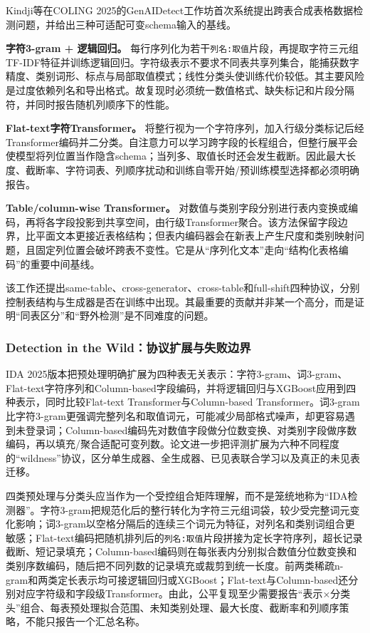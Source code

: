 \documentclass[
  chinese,
  12pt,
  a4paper,
  chinese,
  UTF8]{ctexart}
\begin{document}
Kindji等在COLING
2025的GenAIDetect工作坊首次系统提出跨表合成表格数据检测问题，并给出三种可适配可变schema输入的基线\autocite{kindji2025cross}。

\textbf{字符3-gram + 逻辑回归。}
每行序列化为若干\texttt{列名:取值}片段，再提取字符三元组TF-IDF特征并训练逻辑回归。字符级表示不要求不同表共享列集合，能捕获数字精度、类别词形、标点与局部取值模式；线性分类头使训练代价较低。其主要风险是过度依赖列名和导出格式。故复现时必须统一数值格式、缺失标记和片段分隔符，并同时报告随机列顺序下的性能。

\textbf{Flat-text字符Transformer。}
将整行视为一个字符序列，加入行级分类标记后经Transformer编码并二分类。自注意力可以学习跨字段的长程组合，但整行展平会使模型将列位置当作隐含schema；当列多、取值长时还会发生截断。因此最大长度、截断率、字符词表、列顺序扰动和训练自零开始/预训练模型选择都必须明确报告。

\textbf{Table/column-wise Transformer。}
对数值与类别字段分别进行表内变换或编码，再将各字段投影到共享空间，由行级Transformer聚合。该方法保留字段边界，比平面文本更接近表格结构；但表内编码器会在新表上产生尺度和类别映射问题，且固定列位置会破坏跨表不变性。它是从``序列化文本''走向``结构化表格编码''的重要中间基线。

该工作还提出same-table、cross-generator、cross-table和full-shift四种协议，分别控制表结构与生成器是否在训练中出现。其最重要的贡献并非某一个高分，而是证明``同表区分''和``野外检测''是不同难度的问题。

\subsubsection{Detection in the
Wild：协议扩展与失败边界}\label{detection-in-the-wildux534fux8baeux6269ux5c55ux4e0eux5931ux8d25ux8fb9ux754c}

IDA
2025版本把预处理明确扩展为四种表无关表示：字符3-gram、词3-gram、Flat-text字符序列和Column-based字段编码，并将逻辑回归与XGBoost应用到四种表示，同时比较Flat-text
Transformer与Column-based
Transformer\autocite{kindji2025wild}。词3-gram比字符3-gram更强调完整列名和取值词元，可能减少局部格式噪声，却更容易遇到未登录词；Column-based编码先对数值字段做分位数变换、对类别字段做序数编码，再以填充/聚合适配可变列数。论文进一步把评测扩展为六种不同程度的``wildness''协议，区分单生成器、全生成器、已见表联合学习以及真正的未见表迁移。

四类预处理与分类头应当作为一个受控组合矩阵理解，而不是笼统地称为``IDA检测器''。字符3-gram把规范化后的整行转化为字符三元组词袋，较少受完整词元变化影响；词3-gram以空格分隔后的连续三个词元为特征，对列名和类别词组合更敏感；Flat-text编码把随机排列后的\texttt{列名:取值}片段拼接为定长字符序列，超长记录截断、短记录填充；Column-based编码则在每张表内分别拟合数值分位数变换和类别序数编码，随后把不同列数的记录填充或裁剪到统一长度。前两类稀疏n-gram和两类定长表示均可接逻辑回归或XGBoost；Flat-text与Column-based还分别对应字符级和字段级Transformer。由此，公平复现至少需要报告``表示×分类头''组合、每表预处理拟合范围、未知类别处理、最大长度、截断率和列顺序策略，不能只报告一个汇总名称。
\end{document}

